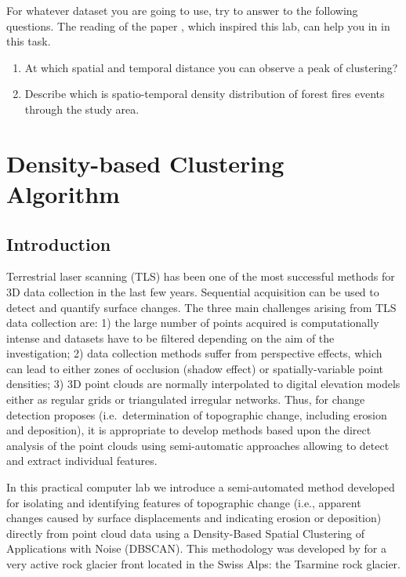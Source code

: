 \documentclass[
]{book}
\begin{document}
For whatever dataset you are going to use, try to answer to the following questions.
The reading of the paper \citet{tonini_evolution_2017}, which inspired this lab, can help you in in this task.

\begin{enumerate}
\def\labelenumi{\arabic{enumi}.}
\item
  At which spatial and temporal distance you can observe a peak of clustering?
\item
  Describe which is spatio-temporal density distribution of forest fires events through the study area.
\end{enumerate}

\hypertarget{density-based-clustering-algorithm}{%
\chapter{Density-based Clustering Algorithm}\label{density-based-clustering-algorithm}}

\hypertarget{introduction-2}{%
\section{Introduction}\label{introduction-2}}

Terrestrial laser scanning (TLS) has been one of the most successful methods for 3D data collection in the last few years.
Sequential acquisition can be used to detect and quantify surface changes.
The three main challenges arising from TLS data collection are: 1) the large number of points acquired is computationally intense and datasets have to be filtered depending on the aim of the investigation; 2) data collection methods suffer from perspective effects, which can lead to either zones of occlusion (shadow effect) or spatially-variable point densities; 3) 3D point clouds are normally interpolated to digital elevation models either as regular grids or triangulated irregular networks.
Thus, for change detection proposes (i.e.~determination of topographic change, including erosion and deposition), it is appropriate to develop methods based upon the direct analysis of the point clouds using semi-automatic approaches allowing to detect and extract individual features.

In this practical computer lab we introduce a semi-automated method developed for isolating and identifying features of topographic change (i.e., apparent changes caused by surface displacements and indicating erosion or deposition) directly from point cloud data using a Density-Based Spatial Clustering of Applications with Noise (DBSCAN).
This methodology was developed by \citet{micheletti_geomorphological_2017} for a very active rock glacier front located in the Swiss Alps: the Tsarmine rock glacier.
\end{document}
